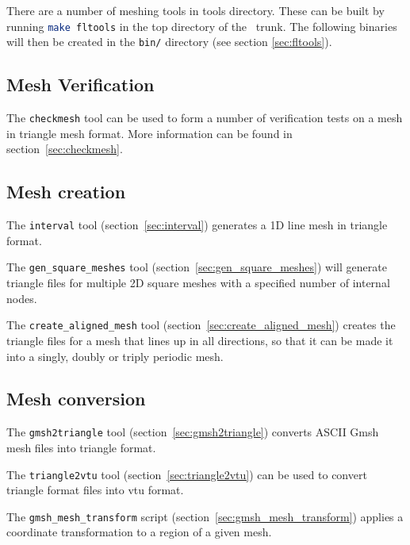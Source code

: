 There are a number of meshing tools in tools directory. These can be built by running 
\lstinline[language = bash]+make fltools+ in the top directory of the \fluidity\ trunk.
The following binaries will then be created in the \lstinline+bin/+ directory (see section \ref{sec:fltools}).

\subsection{Mesh Verification}

The \lstinline[language = Bash]+checkmesh+ tool can be used to form a number of verification tests on a mesh
in triangle mesh format. More information can be found in section~\ref{sec:checkmesh}.

\subsection{Mesh creation}
The \lstinline[language = bash]+interval+ tool (section~\ref{sec:interval}) generates a 1D line mesh in triangle format. 

The \lstinline[language = bash]+gen_square_meshes+ tool (section~\ref{sec:gen_square_meshes})  will generate triangle files for multiple 2D square meshes with a specified number of internal nodes.

The \lstinline[language = bash]+create_aligned_mesh+ tool (section~\ref{sec:create_aligned_mesh}) creates the triangle files for a mesh that lines up in all directions, so that it can be made it into a singly, doubly or triply periodic mesh.

\subsection{Mesh conversion}

The \lstinline[language = Bash]+gmsh2triangle+ tool (section~\ref{sec:gmsh2triangle}) converts ASCII Gmsh mesh files into triangle format.

The \lstinline[language = Bash]+triangle2vtu+ tool (section~\ref{sec:triangle2vtu}) can be used to convert triangle format files into vtu format. 

The \lstinline[language = Bash]+gmsh_mesh_transform+ script (section~\ref{sec:gmsh_mesh_transform}) applies a coordinate transformation to a region of a given mesh. 


